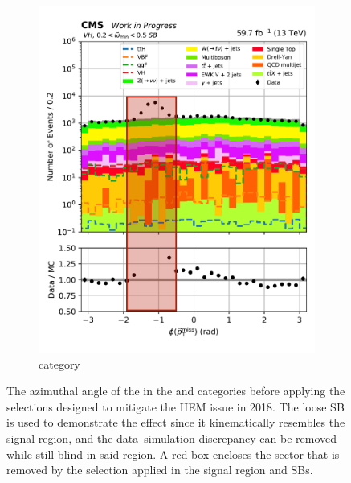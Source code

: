 \begin{figure}[htbp]
    \hspace{0.05\textwidth}
    \begin{subfigure}[b]{0.34\textwidth}
        \includegraphics[width=\textwidth]{figures/hem_issue/sideband_4/met_phi_VH_before_annotated.pdf}
        \caption{\VH category}
    \end{subfigure}
    \caption[The azimuthal angle of the \ptvecmiss in the \ttH and \VH categories before applying the selections designed to mitigate the HEM issue in 2018]{The azimuthal angle of the \ptvecmiss in the \ttH and \VH categories before applying the selections designed to mitigate the HEM issue in 2018. The loose \omegaTilde \gls{SB} is used to demonstrate the effect since it kinematically resembles the signal region, and the data--simulation discrepancy can be removed while still blind in said region. A red box encloses the sector that is removed by the selection applied in the signal region and \glspl{SB}.}
    \label{fig:htoinv_hem_issue_met_phi}
\end{figure}

